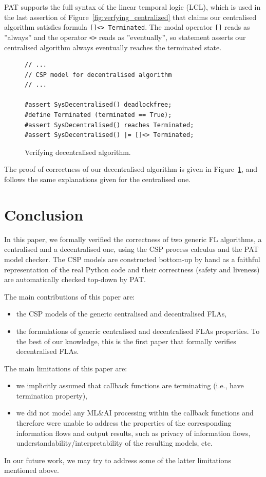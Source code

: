 \documentclass[runningheads]{llncs}
\begin{document}
PAT supports the full syntax of the linear temporal logic (LCL), which is used in the last assertion of Figure~\ref{fig:verfying_centralized} %
that claims our centralised algorithm satisfies formula \lstinline{[]<> Terminated}. The modal operator \lstinline{[]} reads as ''always'' and the operator \lstinline{<>} reads as ''eventually'', so 
statement asserts our centralised algorithm always eventually reaches the terminated state.


\begin{figure}[t]
\begin{lstlisting}[frame=single]
// ...
// CSP model for decentralised algorithm
// ...

#assert SysDecentralised() deadlockfree;
#define Terminated (terminated == True);
#assert SysDecentralised() reaches Terminated;
#assert SysDecentralised() |= []<> Terminated;
\end{lstlisting}
\caption{Verifying decentralised algorithm.}
\label{fig:verifying_decentralized}
\end{figure}



The proof of correctness of our decentralised algorithm is given in Figure~\ref{fig:verifying_decentralized}, and follows the same explanations given for the centralised one.


\section{Conclusion}\label{sec: conclusion}
In this paper, we formally verified the correctness of two generic FL algorithms, a centralised and a decentralised one, using the CSP process calculus and the PAT model checker. The CSP models are constructed bottom-up by hand as a faithful representation of the real Python code and their correctness (safety and liveness) are automatically checked top-down by PAT.

The main contributions of this paper are: 
\begin{itemize}
	\item the CSP models of the generic centralised and decentralised FLAs,
	\item  the formulations of generic centralised and decentralised FLAs properties. To the best of our knowledge, this is the first paper that formally verifies decentralised FLAs.
\end{itemize} 
%
The main limitations of this paper are: 
\begin{itemize}
	\item we implicitly assumed that callback functions are terminating (i.e., have termination property),
	\item  we did not model any ML\&AI processing within the callback functions and therefore were unable to address the properties of the corresponding information flows and output results, such as privacy of information flows, understandability/interpretability of the resulting models, etc.
\end{itemize} 

In our future work, we may try to address some of the latter limitations mentioned above.


 
\end{document}
